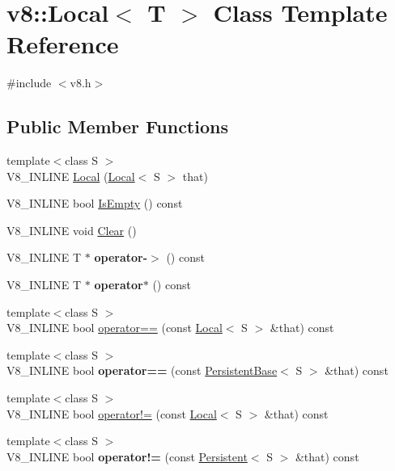 \hypertarget{classv8_1_1Local}{}\section{v8\+:\+:Local$<$ T $>$ Class Template Reference}
\label{classv8_1_1Local}


{\ttfamily \#include $<$v8.\+h$>$}

\subsection*{Public Member Functions}
\begin{DoxyCompactItemize}
\item 
{\footnotesize template$<$class S $>$ }\\V8\+\_\+\+I\+N\+L\+I\+NE \hyperlink{classv8_1_1Local_a18d761713c1062a38f58a568fffe8f80}{Local} (\hyperlink{classv8_1_1Local}{Local}$<$ S $>$ that)
\item 
V8\+\_\+\+I\+N\+L\+I\+NE bool \hyperlink{classv8_1_1Local_ae89b4a4ded13da43d30d9f1a1add8844}{Is\+Empty} () const 
\item 
V8\+\_\+\+I\+N\+L\+I\+NE void \hyperlink{classv8_1_1Local_a6fcf63af6bdd697ddd7c3acd16c69899}{Clear} ()
\item 
V8\+\_\+\+I\+N\+L\+I\+NE T $\ast$ {\bfseries operator-\/$>$} () const \hypertarget{classv8_1_1Local_a46326965caccd4c0e7d0f69d129f356a}{}\label{classv8_1_1Local_a46326965caccd4c0e7d0f69d129f356a}

\item 
V8\+\_\+\+I\+N\+L\+I\+NE T $\ast$ {\bfseries operator$\ast$} () const \hypertarget{classv8_1_1Local_a2aee613b47fb87149c1a9c5af2682826}{}\label{classv8_1_1Local_a2aee613b47fb87149c1a9c5af2682826}

\item 
{\footnotesize template$<$class S $>$ }\\V8\+\_\+\+I\+N\+L\+I\+NE bool \hyperlink{classv8_1_1Local_a85570b6ff0a3328627d1b7bc11513a5b}{operator==} (const \hyperlink{classv8_1_1Local}{Local}$<$ S $>$ \&that) const 
\item 
{\footnotesize template$<$class S $>$ }\\V8\+\_\+\+I\+N\+L\+I\+NE bool {\bfseries operator==} (const \hyperlink{classv8_1_1PersistentBase}{Persistent\+Base}$<$ S $>$ \&that) const \hypertarget{classv8_1_1Local_af3b99ed885d28df2c7c8d0badce5984b}{}\label{classv8_1_1Local_af3b99ed885d28df2c7c8d0badce5984b}

\item 
{\footnotesize template$<$class S $>$ }\\V8\+\_\+\+I\+N\+L\+I\+NE bool \hyperlink{classv8_1_1Local_a5739e619db6d06074d02d99a1b1c79d7}{operator!=} (const \hyperlink{classv8_1_1Local}{Local}$<$ S $>$ \&that) const 
\item 
{\footnotesize template$<$class S $>$ }\\V8\+\_\+\+I\+N\+L\+I\+NE bool {\bfseries operator!=} (const \hyperlink{classv8_1_1Persistent}{Persistent}$<$ S $>$ \&that) const \hypertarget{classv8_1_1Local_af80626441fe9ff1b746763b0e47b697d}{}\label{classv8_1_1Local_af80626441fe9ff1b746763b0e47b697d}


\end{DoxyCompactItemize}
